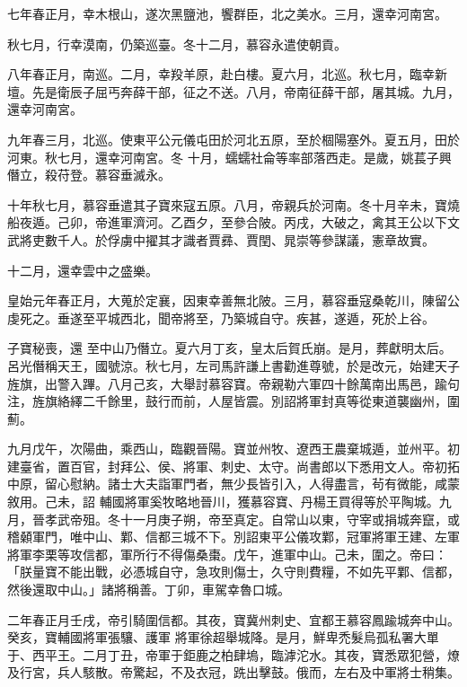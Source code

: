 \begin{pinyinscope}
 七年春正月，幸木根山，遂次黑鹽池，饗群臣，北之美水。三月，還幸河南宮。



 秋七月，行幸漠南，仍築巡臺。冬十二月，慕容永遣使朝貢。



 八年春正月，南巡。二月，幸羖羊原，赴白樓。夏六月，北巡。秋七月，臨幸新壇。先是衛辰子屈丐奔薛干部，征之不送。八月，帝南征薛干部，屠其城。九月，還幸河南宮。



 九年春三月，北巡。使東平公元儀屯田於河北五原，至於棝陽塞外。夏五月，田於河東。秋七月，還幸河南宮。冬
 十月，蠕蠕社侖等率部落西走。是歲，姚萇子興僭立，殺苻登。慕容垂滅永。



 十年秋七月，慕容垂遣其子寶來寇五原。八月，帝親兵於河南。冬十月辛未，寶燒船夜遁。己卯，帝進軍濟河。乙酉夕，至參合陂。丙戌，大破之，禽其王公以下文武將吏數千人。於俘虜中擢其才識者賈彞、賈閏、晁崇等參謀議，憲章故實。



 十二月，還幸雲中之盛樂。



 皇始元年春正月，大蒐於定襄，因東幸善無北陂。三月，慕容垂寇桑乾川，陳留公虔死之。垂遂至平城西北，聞帝將至，乃築城自守。疾甚，遂遁，死於上谷。



 子寶秘喪，還
 至中山乃僭立。夏六月丁亥，皇太后賀氏崩。是月，葬獻明太后。呂光僭稱天王，國號涼。秋七月，左司馬許謙上書勸進尊號，於是改元，始建天子旌旗，出警入蹕。八月己亥，大舉討慕容寶。帝親勒六軍四十餘萬南出馬邑，踰句注，旌旗絡繹二千餘里，鼓行而前，人屋皆震。別詔將軍封真等從東道襲幽州，圍薊。



 九月戊午，次陽曲，乘西山，臨觀晉陽。寶並州牧、遼西王農棄城遁，並州平。初建臺省，置百官，封拜公、侯、將軍、刺史、太守。尚書郎以下悉用文人。帝初拓中原，留心慰納。諸士大夫詣軍門者，無少長皆引入，人得盡言，茍有微能，咸蒙敘用。己未，詔
 輔國將軍奚牧略地晉川，獲慕容寶、丹楊王買得等於平陶城。九月，晉孝武帝殂。冬十一月庚子朔，帝至真定。自常山以東，守宰或捐城奔竄，或稽顙軍門，唯中山、鄴、信都三城不下。別詔東平公儀攻鄴，冠軍將軍王建、左軍將軍李栗等攻信都，軍所行不得傷桑棗。戊午，進軍中山。己未，圍之。帝曰：「朕量寶不能出戰，必憑城自守，急攻則傷士，久守則費糧，不如先平鄴、信都，然後還取中山。」諸將稱善。丁卯，車駕幸魯口城。



 二年春正月壬戌，帝引騎圍信都。其夜，寶冀州刺史、宜都王慕容鳳踰城奔中山。癸亥，寶輔國將軍張驤、護軍
 將軍徐超舉城降。是月，鮮卑禿髮烏孤私署大單于、西平王。二月丁丑，帝軍于鉅鹿之柏肆塢，臨滹沱水。其夜，寶悉眾犯營，燎及行宮，兵人駭散。帝驚起，不及衣冠，跣出擊鼓。俄而，左右及中軍將士稍集。




\end{pinyinscope}
